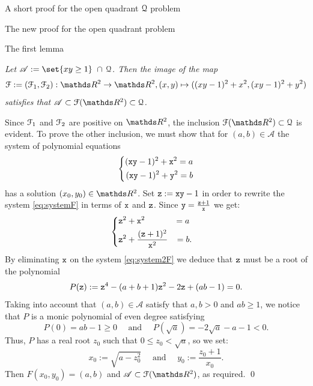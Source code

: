 \documentclass[11pt, a4paper, english, twoside, notitlepage, openright]{report}
\begin{document}
\begin{chapter}{A short proof for the open quadrant $\mathcal{Q}$ problem}
\begin{section}{The new proof for the open quadrant problem}
\begin{subsection}{The first lemma}
\begin{lemma}\label{lemma1} \em Let $\mathscr{A}:=\set{xy\ge1}\ \cap\, \Qu$. Then the image of the map
$$
\FF:=(\FF_1,\FF_2):\R^2\to\R^2,(x,y)\mapsto((xy-1)^2+x^2,(xy-1)^2+y^2)
$$
satisfies that $\mathscr{A}\subset\FF(\R^2)\subset\Qu$. \em 
\begin{Proof}
Since $\mathcal{F}_1$ and $\mathcal{F}_2$ are positive on $\R^2$, the inclusion $\FF(\R^2) \subset \Qu$ is evident. To prove the other inclusion, we must show that for $(a,b)\in\mathscr{A}$ the system of polynomial equations
\begin{equation}\label{eq:systemF}
\left\{
\begin{aligned}
({\tt x}{\tt y}-1)^2+{\tt x}^2=a\\
({\tt x}{\tt y}-1)^2+{\tt y}^2=b\\
\end{aligned}
\right.
\end{equation}
has a solution $(x_0,y_0)\in\R^2$. Set ${\tt z}:={\tt x}{\tt y}-1$ in order to rewrite the system \ref{eq:systemF} in terms of ${\tt x}$ and ${\tt z}$. Since ${\tt y}=\frac{{\tt z}+1}{{\tt x}}$ we get:
\begin{equation}\label{eq:system2F}
\left\{
\begin{aligned}
&{\tt z}^2+{\tt x}^2&=a\\
&{\tt z}^2+\frac{({\tt z}+1)^2}{{\tt x}^2}&=b&.\\
\end{aligned}
\right.
\end{equation}
By eliminating ${\tt x}$ on the system \ref{eq:system2F} we deduce that ${\tt z}$ must be a root of the polynomial
$$
P({\tt z}):={\tt z}^4-(a+b+1){\tt z}^2-2{\tt z}+(ab-1)=0.
$$
Taking into account that $(a,b)\in\mathscr{A}$ satisfy that $a,b>0$ and $ab\ge1$, we notice that $P$ is a monic polynomial of even degree satisfying
$$
P(0)=ab-1\ge0\quad\text{ and }\quad P(\sqrt{a})=-2\sqrt{a}-a-1<0.
$$
Thus, $P$ has a real root $z_0$ such that $0\le z_0<\sqrt{a}$, so we set:
$$
x_0:=\sqrt{a-z_0^2}\quad \text{ and } \quad y_0:= \frac{z_0+1}{x_0}.
$$
Then $F(x_0,y_0)=(a,b)$ and $\mathscr{A}\subset\FF(\R^2)$, as required.
\qed
\end{Proof}
\end{lemma}
\end{subsection}


\end{section}
\end{chapter}
\end{document}
